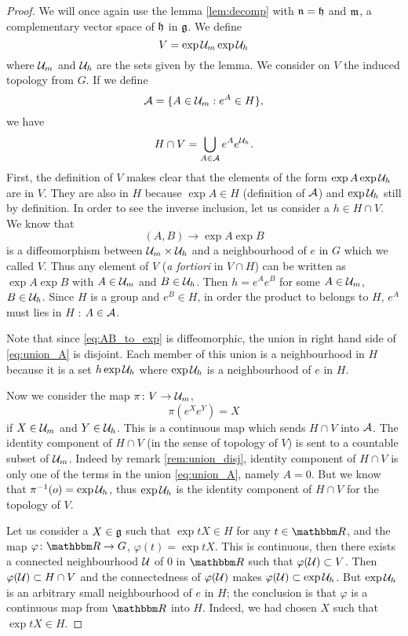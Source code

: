 \begin{proof}
We will once again use the lemma  \ref{lem:decomp} with $\mathfrak{n}=\mathfrak{h}$ and $\mathfrak{m}$, a complementary vector space of $\mathfrak{h}$ in $\mathfrak{g}$. We define 
\[
   V=\exp\mathcal{U}_m\exp\mathcal{U}_h
\]
where $\mathcal{U}_m$ and $\mathcal{U}_h$ are the sets given by the lemma. We consider on $V$ the induced topology from $G$. If we define
\[
   \mathcal{A}=\{A\in\mathcal{U}_m:e^{A}\in H\},
\]
we have 
\begin{equation}\label{eq:union_A}
   H\cap V=\bigcup_{A\in\mathcal{A}}e^{A}e^{\mathcal{U}_h}.
\end{equation}
First, the definition of $V$ makes clear that the elements of the form $\exp A\exp\mathcal{U}_h$ are in $V$. They are also in $H$ because $\exp A\in H$ (definition of $\mathcal{A}$) and $\exp\mathcal{U}_h$ still by definition. In order to see the inverse inclusion, let us consider a $h\in H\cap V$. We know that 
\begin{equation}\label{eq:AB_to_exp}
(A,B)\to\exp A\exp B 
\end{equation}
is a diffeomorphism between $\mathcal{U}_m\times\mathcal{U}_h$ and a neighbourhood of $e$ in $G$ which we called $V$. Thus any element of $V$ (\emph{a fortiori} in $V\cap H$) can be written as $\exp A\exp B$ with $A\in\mathcal{U}_m$ and $B\in\mathcal{U}_h$. Then $h=e^Ae^B$ for some $A\in\mathcal{U}_m$, $B\in\mathcal{U}_h$. Since $H$ is a group and $e^B\in H$, in order the product to belongs to $H$, $e^A$ must lies in $H$ : $A\in\mathcal{A}$.

\begin{remark}\label{rem:union_disj}
Note that since \eqref{eq:AB_to_exp} is diffeomorphic, the union in right hand side of \eqref{eq:union_A} is disjoint. Each member of this union is a neighbourhood in $H$ because it is a set $h\exp\mathcal{U}_h$ where $\exp\mathcal{U}_h$ is a neighbourhood of $e$ in $H$.
\end{remark}

Now we consider the map $\pi\colon V\to \mathcal{U}_m$, 
\[
  \pi(e^{X}e^Y)=X
\]
if $X\in\mathcal{U}_m$ and $Y\in\mathcal{U}_h$. This is a continuous map which sends $H\cap V$ into $\mathcal{A}$. The identity component of $H\cap V$ (in the sense of topology of $V$) is sent to a countable subset of $\mathcal{U}_m$. Indeed by remark \ref{rem:union_disj}, identity component of $H\cap V$ is only one of the terms in the union \eqref{eq:union_A}, namely $A=0$. But we know that $\pi^{-1}(o)=\exp\mathcal{U}_h$, thus $\exp\mathcal{U}_h$ is the identity component of $H\cap V$ for the topology of $V$.

Let us consider a $X\in\mathfrak{g}$ such that $\exp tX\in H$ for any $t\in\eR$, and the map $\dpt{\varphi}{\eR}{G}$, $\varphi(t)=\exp tX$. This is continuous, then there exists a connected neighbourhood $\mathcal{U}$ of $0$ in $\eR$ such that $\varphi(\mathcal{U})\subset V$. Then $\varphi(\mathcal{U})\subset H\cap V$ and the connectedness of $\varphi(\mathcal{U})$ makes $\varphi(\mathcal{U})\subset\exp\mathcal{U}_h$. But $\exp\mathcal{U}_h$ is an arbitrary small neighbourhood of $e$ in $H$; the conclusion is that $\varphi$ is a continuous map from $\eR$ into $H$. Indeed, we had chosen $X$ such that $\exp tX\in H$.


\end{proof}
